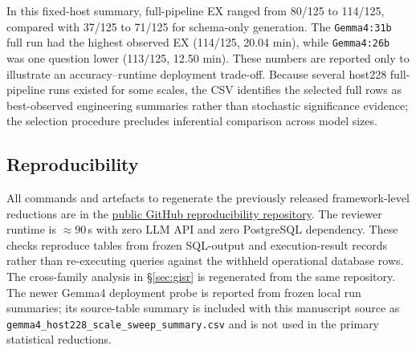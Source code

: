 In this fixed-host summary, full-pipeline EX ranged from 80/125 to 114/125, compared with 37/125 to 71/125 for schema-only generation. The \texttt{Gemma4:31b} full run had the highest observed EX (114/125, 20.04 min), while \texttt{Gemma4:26b} was one question lower (113/125, 12.50 min). These numbers are reported only to illustrate an accuracy--runtime deployment trade-off. Because several host228 full-pipeline runs existed for some scales, the CSV identifies the selected full rows as best-observed engineering summaries rather than stochastic significance evidence; the selection procedure precludes inferential comparison across model sizes.

\subsection{Reproducibility}
\label{sec:reproducibility-stub}

All commands and artefacts to regenerate the previously released framework-level reductions are in the \href{https://github.com/zhouning/nl2geosql-reproduction}{public GitHub reproducibility repository}.
The reviewer runtime is $\approx 90$\,s with zero LLM API and zero PostgreSQL dependency. These checks reproduce tables from frozen SQL-output and execution-result records rather than re-executing queries against the withheld operational database rows. The cross-family analysis in \S\ref{sec:gisr} is regenerated from the same repository. The newer Gemma4 deployment probe is reported from frozen local run summaries; its source-table summary is included with this manuscript source as \texttt{gemma4\_host228\_scale\_sweep\_summary.csv} and is not used in the primary statistical reductions.

